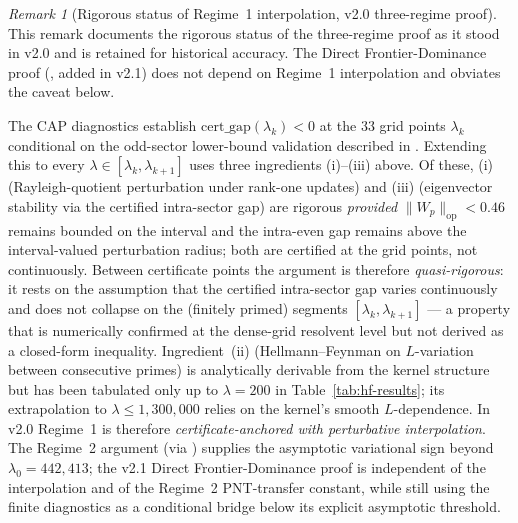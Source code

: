 \documentclass[12pt,a4paper]{article}
\theoremstyle{definition}
\theoremstyle{remark}
\newtheorem{remark}[theorem]{Remark}
\begin{document}
\begin{remark}[Rigorous status of Regime~1 interpolation, v2.0 three-regime proof]
\label{rem:regime1-caveat}
This remark documents the rigorous status of the three-regime proof as it stood in v2.0 and is retained for historical accuracy. The Direct Frontier-Dominance proof (, added in v2.1) does not depend on Regime~1 interpolation and obviates the caveat below.

The CAP diagnostics establish $\mathrm{cert\_gap}(\lambda_k) < 0$ at the $33$ grid points $\lambda_k$ conditional on the odd-sector lower-bound validation described in . Extending this to every $\lambda \in [\lambda_k, \lambda_{k+1}]$ uses three ingredients (i)--(iii) above. Of these, (i) (Rayleigh-quotient perturbation under rank-one updates) and (iii) (eigenvector stability via the certified intra-sector gap) are rigorous \emph{provided} $\|W_p\|_{\mathrm{op}} < 0.46$ remains bounded on the interval and the intra-even gap remains above the interval-valued perturbation radius; both are certified at the grid points, not continuously. Between certificate points the argument is therefore \emph{quasi-rigorous}: it rests on the assumption that the certified intra-sector gap varies continuously and does not collapse on the (finitely primed) segments $[\lambda_k, \lambda_{k+1}]$ --- a property that is numerically confirmed at the dense-grid resolvent level but not derived as a closed-form inequality. Ingredient~(ii) (Hellmann--Feynman on $L$-variation between consecutive primes) is analytically derivable from the kernel structure but has been tabulated only up to $\lambda = 200$ in Table~\ref{tab:hf-results}; its extrapolation to $\lambda \leq 1{,}300{,}000$ relies on the kernel's smooth $L$-dependence. In v2.0 Regime~1 is therefore \emph{certificate-anchored with perturbative interpolation}. The Regime~2 argument (via ) supplies the asymptotic variational sign beyond $\lambda_0 = 442{,}413$; the v2.1 Direct Frontier-Dominance proof is independent of the interpolation and of the Regime~2 PNT-transfer constant, while still using the finite diagnostics as a conditional bridge below its explicit asymptotic threshold.
\end{remark}
\end{document}
